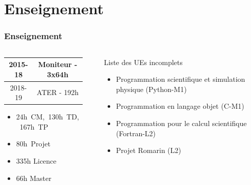 \documentclass[usenames,dvipsnames,xcolor=table]{beamer}
\newcommand{\CC}{C\nolinebreak\hspace{-.05em}\raisebox{.4ex}{\tiny\bf+}\nolinebreak\hspace{-.10em}\raisebox{.4ex}{\tiny\bf +}}\def\CC{{C\nolinebreak[4]\hspace{-.05em}\raisebox{.4ex}{\tiny\bf ++}}}
\begin{document}

\section{Enseignement}

\begin{frame}
\frametitle{Enseignement}

\begin{columns}
\begin{column}{0.49\linewidth}
\bgroup
\def\arraystretch{1.5}
\begin{tabular}{|c|c|}
    \hline
     2015-18 & Moniteur - 3x64h  \\ \hline
     2018-19 & ATER - 192h \\ \hline
\end{tabular}
\egroup
\vspace{10pt}
\begin{itemize}
    \item 24h~CM,~130h~TD,~167h~TP
    \item 80h~Projet
    \item 335h Licence
    \item 66h Master
\end{itemize}

\end{column}

\begin{column}{0.02\linewidth}
\end{column}

\begin{column}{0.49\linewidth}
{\centering Liste des UEs incomplets}
\begin{itemize}
    \item Programmation scientifique et simulation physique (Python-M1)
    \item Programmation en langage objet (\CC-M1)
    \item Programmation pour le calcul scientifique (Fortran-L2)
    \item Projet Romarin (L2)
\end{itemize}
\end{column}
\end{columns}

\end{frame}
\end{document}
